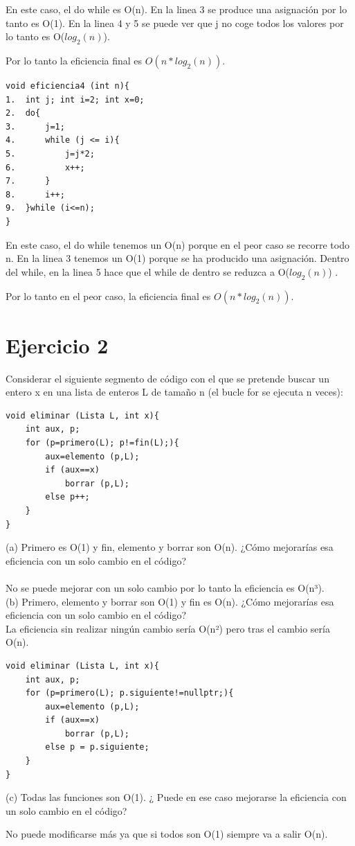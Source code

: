 \documentclass[12pt, spanish]{article}
\begin{document}
En este caso, el do while es O(n). En la linea 3 se produce una asignación por lo tanto es O(1).  En la linea 4 y 5 se puede ver que j no coge todos los valores por lo tanto es O($log_2(n)$). 

Por lo tanto la eficiencia final es $O(n * log_2(n))$.

\begin{lstlisting}
void eficiencia4 (int n){
1.	int j; int i=2; int x=0;
2.	do{
3.		j=1;
4.		while (j <= i){
5.			j=j*2;
6.			x++;
7.		}
8.		i++;
9.	}while (i<=n);
}

\end{lstlisting}

En este caso, el do while tenemos un O(n) porque en el peor caso se recorre todo n. En la linea 3 tenemos un O(1) porque se ha producido una asignación. Dentro del while, en la linea 5 hace que el while de dentro se reduzca a O($log_2(n)$) .

Por lo tanto en el peor caso, la eficiencia final es $O(n * log_2(n))$.

\pagebreak

\section{Ejercicio 2}

Considerar el siguiente segmento de código con el que se pretende buscar un entero x en una lista de enteros L de tamaño n (el bucle for se ejecuta n veces):

\begin{lstlisting}
void eliminar (Lista L, int x){
	int aux, p;
	for (p=primero(L); p!=fin(L);){
		aux=elemento (p,L);
		if (aux==x)
			borrar (p,L);
		else p++;
	}
}

\end{lstlisting}

(a) Primero es O(1) y fin, elemento y borrar son O(n). ¿Cómo mejorarías esa eficiencia con un solo cambio en el código? \\ \\
No se puede mejorar con un solo cambio por lo tanto la eficiencia  es O(n³). \\

(b) Primero, elemento y borrar son O(1) y fin es O(n). ¿Cómo mejorarías esa eficiencia con un solo cambio en el código? \\

La eficiencia sin realizar ningún cambio sería O(n²) pero tras el cambio sería O(n).

\begin{lstlisting}
void eliminar (Lista L, int x){
    int aux, p;
    for (p=primero(L); p.siguiente!=nullptr;){
        aux=elemento (p,L);
        if (aux==x)
            borrar (p,L);
        else p = p.siguiente;
    }
}
\end{lstlisting}

(c) Todas las funciones son O(1). ¿ Puede en ese caso mejorarse la eficiencia con un solo cambio en el código?

No puede modificarse más ya que si todos son O(1) siempre va a salir O(n). 
\end{document}
